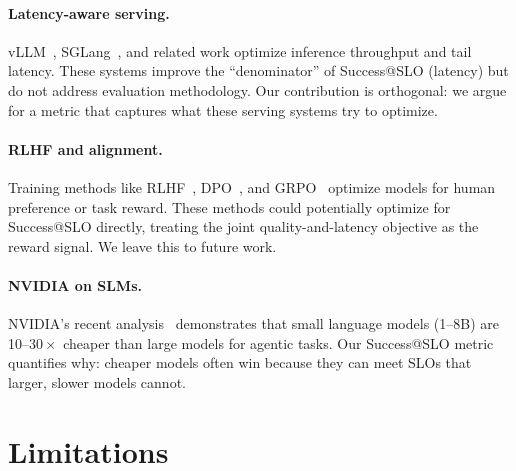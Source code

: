 \documentclass[11pt]{article}
\begin{document}
\paragraph{Latency-aware serving.}
vLLM~\citep{kwon2023vllm}, SGLang~\citep{zheng2023sglang}, and related work optimize inference throughput and tail latency.
These systems improve the ``denominator'' of Success@SLO (latency) but do not address evaluation methodology.
Our contribution is orthogonal: we argue for a metric that captures what these serving systems try to optimize.

\paragraph{RLHF and alignment.}
Training methods like RLHF~\citep{ouyang2022rlhf}, DPO~\citep{rafailov2023dpo}, and GRPO~\citep{grpo} optimize models for human preference or task reward.
These methods could potentially optimize for Success@SLO directly, treating the joint quality-and-latency objective as the reward signal.
We leave this to future work.

\paragraph{NVIDIA on SLMs.}
NVIDIA's recent analysis~\citep{nvidia2025slm} demonstrates that small language models (1--8B) are 10--$30\times$ cheaper than large models for agentic tasks.
Our Success@SLO metric quantifies why: cheaper models often win because they can meet SLOs that larger, slower models cannot.

\section{Limitations}
\label{sec:limitations}
\end{document}
